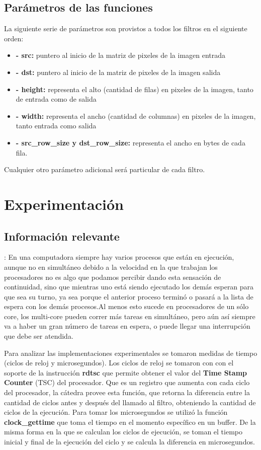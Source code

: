 \documentclass[a4paper]{article}
\begin{document}
\subsection{Parámetros de las funciones}
La siguiente serie de parámetros son provistos a todos los filtros en el siguiente orden:
\begin{itemize}
    \item \textbf{- src:} puntero al inicio de la matriz de pixeles de la imagen entrada
    \item \textbf{- dst:} puntero al inicio de la matriz de pixeles de la imagen salida
    \item \textbf{- height:} representa el alto (cantidad de filas) en pixeles de la imagen, tanto de entrada como de salida
    \item \textbf{- width:} representa el ancho (cantidad de columnas) en pixeles de la imagen, tanto entrada como salida
    \item \textbf{- src_row_size y dst_row_size:} representa el ancho en bytes de cada fila.
\end{itemize}
 Cualquier otro parámetro adicional será particular de cada filtro.







\section{Experimentación}
\subsection{Información relevante}:
En una computadora siempre hay varios procesos que están en ejecución, aunque no en simultáneo debido a la velocidad en la que trabajan los procesadores no es algo que podamos percibir dando esta sensación de continuidad, sino que mientras uno está siendo ejecutado los demás esperan para que sea su turno, ya sea porque el anterior proceso terminó o pasará a la lista de espera con los demás procesos.Al menos esto sucede en procesadores de un sólo core, los multi-core pueden correr más tareas en simultáneo, pero aún así siempre va a haber un gran número de tareas en espera, o puede llegar una interrupción que debe ser atendida.

Para analizar las implementaciones experimentales se tomaron medidas de tiempo (ciclos de reloj y microsegundos). 
Los ciclos de reloj se tomaron con con el soporte de la instrucción \textbf{rdtsc} que permite obtener el valor del \textbf{Time Stamp Counter} (TSC) del procesador. Que es un registro que aumenta con cada ciclo del procesador, la cátedra provee esta función, que retorna la diferencia entre la cantidad de ciclos antes y después del llamado al filtro, obteniendo la cantidad de ciclos de la ejecución.
Para tomar los microsegundos se utilizó la función \textbf{clock_gettime} que toma el tiempo en el momento específico en un buffer. De la misma forma en la que se calculan los ciclos de ejecución, se toman el tiempo inicial y final de la ejecución del ciclo y se calcula la diferencia en microsegundos.
\end{document}

